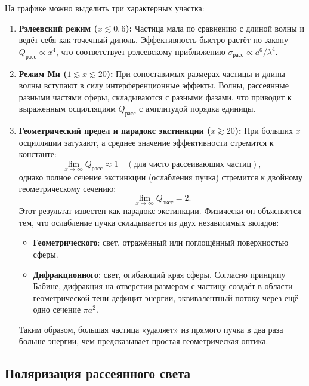 \documentclass[12pt, a4paper]{article}
\begin{document}
На графике можно выделить три характерных участка:
\begin{enumerate}
    \item \textbf{Рэлеевский режим ($x \lesssim 0,6$):} Частица мала по сравнению с длиной волны и ведёт себя как точечный диполь. Эффективность быстро растёт по закону $Q_{\text{расс}} \propto x^4$, что соответствует рэлеевскому приближению $\sigma_{\text{расс}} \propto a^6/\lambda^4$.

    \item \textbf{Режим Ми ($1 \lesssim x \lesssim 20$):} При сопоставимых размерах частицы и длины волны вступают в силу интерференционные эффекты. Волны, рассеянные разными частями сферы, складываются с разными фазами, что приводит к выраженным осцилляциям $Q_{\text{расс}}$ с амплитудой порядка единицы.

    \item \textbf{Геометрический предел и парадокс экстинкции ($x \gtrsim 20$):} При больших $x$ осцилляции затухают, а среднее значение эффективности стремится к константе:
    \begin{equation}
        \lim_{x \to \infty} Q_{\text{расс}} \approx 1 \quad (\text{для чисто рассеивающих частиц}),
    \end{equation}
    однако полное сечение экстинкции (ослабления пучка) стремится к двойному геометрическому сечению:
    \begin{equation}
        \lim_{x \to \infty} Q_{\text{экст}} = 2.
    \end{equation}
    Этот результат известен как парадокс экстинкции. Физически он объясняется тем, что ослабление пучка складывается из двух независимых вкладов:
    \begin{itemize}
        \item \textbf{Геометрического}: свет, отражённый или поглощённый поверхностью сферы.
        \item \textbf{Дифракционного}: свет, огибающий края сферы. Согласно принципу Бабине, дифракция на отверстии размером с частицу создаёт в области геометрической тени дефицит энергии, эквивалентный потоку через ещё одно сечение $\pi a^2$.
    \end{itemize}
    Таким образом, большая частица «удаляет» из прямого пучка в два раза больше энергии, чем предсказывает простая геометрическая оптика.
\end{enumerate}




\subsection*{Поляризация рассеянного света}
\end{document}
